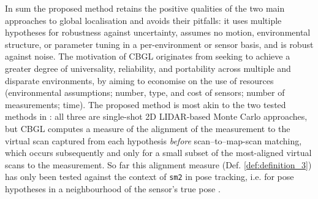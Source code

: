 In sum the proposed method retains the positive qualities of the two main approaches to global
localisation and avoids their pitfalls: it uses multiple hypotheses for
robustness against uncertainty, assumes no motion, environmental structure, or
parameter tuning in a per-environment or sensor basis, and is robust against
noise.
The motivation of CBGL originates from seeking to achieve a
greater degree of universality, reliability, and portability across multiple
and disparate environments, by aiming to economise on the use of resources
(environmental assumptions; number, type, and cost of sensors; number of
measurements; time). The proposed method is most akin to the two tested
methods in \cite{Filotheou2022g}: all three are single-shot 2D LIDAR-based
Monte Carlo approaches, but CBGL computes a measure of the alignment of the
measurement to the virtual scan captured from each hypothesis
\textit{before} scan--to--map-scan matching, which occurs subsequently and only
for a small subset of the most-aligned virtual scans to the measurement. So far
this alignment measure (Def. \ref{def:definition_3}) has only been tested
against the context of \texttt{sm2} in pose tracking, i.e. for pose hypotheses
in a neighbourhood of the sensor's true pose%
\cite{Filotheou2022f,Filotheou2023a}.
